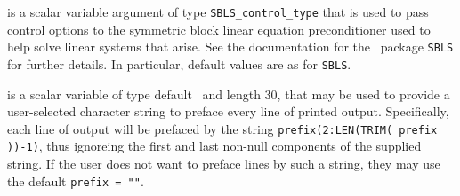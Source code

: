 \begin{description}
 is a scalar variable argument of type 
{\tt SBLS\_control\_type} that is used to pass control
options to the symmetric block linear equation preconditioner 
used to help solve linear systems that arise. 
See the documentation for the \galahad\ package {\tt SBLS} for further details. 
In particular, default values are as for {\tt SBLS}.

 is a scalar variable of type default \character\
and length 30, that may be used to provide a user-selected 
character string to preface every line of printed output. 
Specifically, each line of output will be prefaced by the string 
{\tt prefix(2:LEN(TRIM( prefix ))-1)},
thus ignoreing the first and last non-null components of the
supplied string. If the user does not want to preface lines by such
a string, they may use the default {\tt prefix = ""}.

\end{description}
